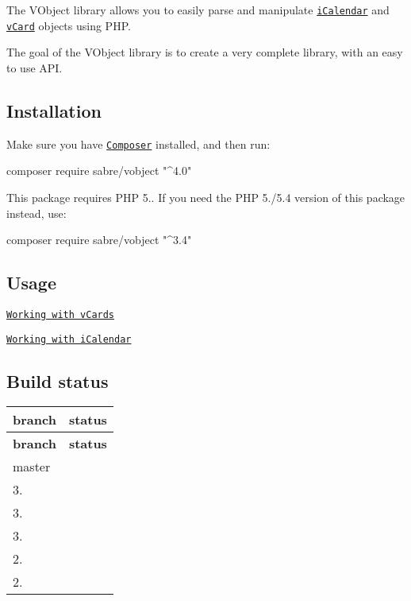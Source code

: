 The V\+Object library allows you to easily parse and manipulate \href{https://tools.ietf.org/html/rfc5545}{\tt i\+Calendar} and \href{https://tools.ietf.org/html/rfc6350}{\tt v\+Card} objects using P\+HP.

The goal of the V\+Object library is to create a very complete library, with an easy to use A\+PI.

\subsection*{Installation }

Make sure you have \href{https://getcomposer.org/}{\tt Composer} installed, and then run\+: \begin{DoxyVerb}composer require sabre/vobject "^4.0"
\end{DoxyVerb}


This package requires P\+HP 5.. If you need the P\+HP 5./5.4 version of this package instead, use\+:

\begin{DoxyVerb}composer require sabre/vobject "^3.4"
\end{DoxyVerb}


\subsection*{Usage }


\begin{DoxyItemize}
\item \href{http://sabre.io/vobject/vcard/}{\tt Working with v\+Cards}
\item \href{http://sabre.io/vobject/icalendar/}{\tt Working with i\+Calendar}
\end{DoxyItemize}

\subsection*{Build status }

\tabulinesep=1mm
\begin{longtabu} spread 0pt [c]{*{2}{|X[-1]}|}
\hline
\rowcolor{\tableheadbgcolor}\textbf{ branch  }&\textbf{ status   }\\
\endfirsthead
\hline
\endfoot
\hline
\rowcolor{\tableheadbgcolor}\textbf{ branch  }&\textbf{ status   }\\
\endhead
master  &\href{https://travis-ci.org/fruux/sabre-vobject}{\tt }   \\
3.  &\href{https://travis-ci.org/fruux/sabre-vobject}{\tt }   \\
3.  &\href{https://travis-ci.org/fruux/sabre-vobject}{\tt }   \\
3.  &\href{https://travis-ci.org/fruux/sabre-vobject}{\tt }   \\
2.  &\href{https://travis-ci.org/fruux/sabre-vobject}{\tt }   \\
2.  &\href{https://travis-ci.org/fruux/sabre-vobject}{\tt }   \\
\end{longtabu}


